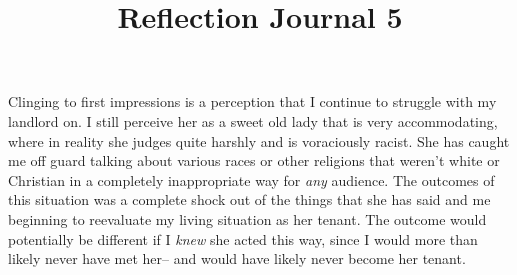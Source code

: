 \documentclass[12pt]{article}
\begin{document}
\title{Reflection Journal 5}


\par
\par
Clinging to first impressions is a perception that I continue to struggle with my landlord on. I still perceive her as a sweet old lady that is very accommodating, where in reality she judges quite harshly and is voraciously racist. She has caught me off guard talking about various races or other religions that weren't white or Christian in a completely inappropriate way for \emph{any} audience. The outcomes of this situation was a complete shock out of the things that she has said and me beginning to reevaluate my living situation as her tenant. The outcome would potentially be different if I \emph{knew} she acted this way, since I would more than likely never have met her-- and would have likely never become her tenant. 
\par
\end{document}
